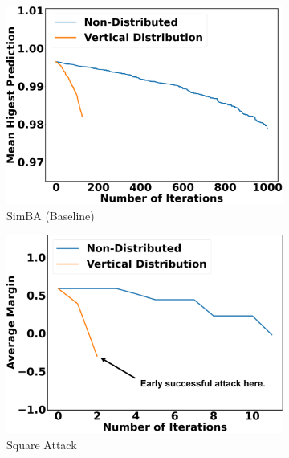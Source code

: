 \begin{figure}[tp]
\centering
\begin{subfigure}[b]{0.32\textwidth}
    \centering
    \includegraphics[width=\textwidth]{figures/chapter_classification/simba_attack_vertical_margin.png}
    \caption{SimBA (Baseline)}
    \label{fig:simba_plot}
\end{subfigure}
\hfill
\begin{subfigure}[b]{0.32\textwidth}
    \centering
    \includegraphics[width=\textwidth]{figures/chapter_classification/square_attack_vertical_margin.png}
    \caption{Square Attack}
    \label{fig:square_plot}
\end{subfigure}
\hfill
\begin{subfigure}[b]{0.32\textwidth}
    \centering

\end{subfigure}
\end{figure}
